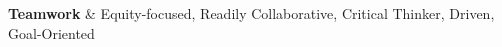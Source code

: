 \textbf{Teamwork} & 
Equity-focused, 
Readily Collaborative, 
Critical Thinker, 
Driven, 
Goal-Oriented